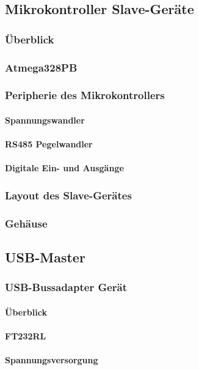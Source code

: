 \subsection{Mikrokontroller Slave-Geräte}
\subsubsection{Überblick}
\subsubsection{Atmega328PB}
\subsubsection{Peripherie des Mikrokontrollers}
\paragraph{Spannungswandler}
\paragraph{RS485 Pegelwandler}
\paragraph{Digitale Ein- und Ausgänge}
\subsubsection{Layout des Slave-Gerätes}
\subsubsection{Gehäuse}


\subsection{USB-Master}
\subsubsection{USB-Bussadapter Gerät}
\paragraph{Überblick}
\paragraph{FT232RL}
\paragraph{Spannungsversorgung}
